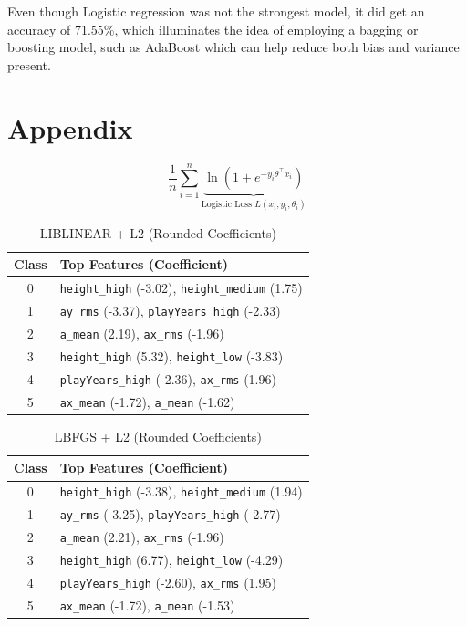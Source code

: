 \documentclass[10pt,twocolumn]{article}
\begin{document}
Even though Logistic regression was not the strongest model, it did get an accuracy of 71.55\%, which illuminates the idea of employing a bagging or boosting model, such as AdaBoost which can help reduce both bias and variance present.

\printbibliography

\appendix
\section*{Appendix}



\begin{equation}{\dfrac 1 n} \sum^n_{i=1}  \underbrace{\ln ({1+e^{-y_i \theta^\top x_i}})}_{\text{Logistic Loss \ } L(x_i, y_i, \theta_i)}\label{eq:logistic-loss}
\end{equation}

\begin{table}[H]
\centering
\footnotesize
\caption{LIBLINEAR + L2 (Rounded Coefficients)}
\begin{tabular}{|c|p{6.5cm}|}
\hline
\textbf{Class} & \textbf{Top Features (Coefficient)} \\
\hline
0 & \texttt{height\_high} (-3.02), \texttt{height\_medium} (1.75) \\
1 & \texttt{ay\_rms} (-3.37), \texttt{playYears\_high} (-2.33) \\
2 & \texttt{a\_mean} (2.19), \texttt{ax\_rms} (-1.96) \\
3 & \texttt{height\_high} (5.32), \texttt{height\_low} (-3.83) \\
4 & \texttt{playYears\_high} (-2.36), \texttt{ax\_rms} (1.96) \\
5 & \texttt{ax\_mean} (-1.72), \texttt{a\_mean} (-1.62) \\
\hline
\end{tabular}
\label{tab:logreg-liblinear-l2}
\end{table}

\begin{table}[H]
\centering
\footnotesize
\caption{LBFGS + L2 (Rounded Coefficients)}
\begin{tabular}{|c|p{6.5cm}|}
\hline
\textbf{Class} & \textbf{Top Features (Coefficient)} \\
\hline
0 & \texttt{height\_high} (-3.38), \texttt{height\_medium} (1.94) \\
1 & \texttt{ay\_rms} (-3.25), \texttt{playYears\_high} (-2.77) \\
2 & \texttt{a\_mean} (2.21), \texttt{ax\_rms} (-1.96) \\
3 & \texttt{height\_high} (6.77), \texttt{height\_low} (-4.29) \\
4 & \texttt{playYears\_high} (-2.60), \texttt{ax\_rms} (1.95) \\
5 & \texttt{ax\_mean} (-1.72), \texttt{a\_mean} (-1.53) \\
\hline
\end{tabular}
\label{tab:logreg-lbfgs-l2}
\end{table}
\end{document}
